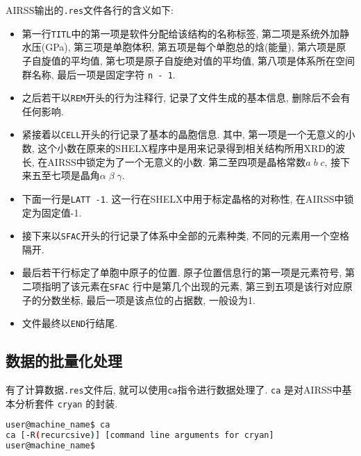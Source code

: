 \documentclass[a4paper, 10pt]{article}
\begin{document}
AIRSS输出的\verb|.res|文件各行的含义如下:
\begin{itemize}
\item 第一行\verb|TITL|中的第一项是软件分配给该结构的名称标签, 第二项是系统外加静水压(GPa), 第三项是单胞体积, 第五项是每个单胞总的焓(能量), 第六项是原子自旋值的平均值, 第七项是原子自旋绝对值的平均值, 第八项是体系所在空间群名称, 最后一项是固定字符 \verb|n - 1|.
\item 之后若干以\verb|REM|开头的行为注释行, 记录了文件生成的基本信息, 删除后不会有任何影响.
\item 紧接着以\verb|CELL|开头的行记录了基本的晶胞信息. 其中, 第一项是一个无意义的小数, 这个小数在原来的SHELX程序中是用来记录得到相关结构所用XRD的波长, 在AIRSS中锁定为了一个无意义的小数. 第二至四项是晶格常数\(a\;b\;c\), 接下来五至七项是晶角\(\alpha\;\beta\;\gamma\).
\item 下面一行是\verb|LATT -1|. 这一行在SHELX中用于标定晶格的对称性, 在AIRSS中锁定为固定值-1.
\item 接下来以\verb|SFAC|开头的行记录了体系中全部的元素种类, 不同的元素用一个空格隔开.
\item 最后若干行标定了单胞中原子的位置. 原子位置信息行的第一项是元素符号, 第二项指明了该元素在\verb|SFAC| 行中是第几个出现的元素, 第三到五项是该行对应原子的分数坐标, 最后一项是该点位的占据数, 一般设为1.
\item 文件最终以\verb|END|行结尾.
\end{itemize}

\subsection{数据的批量化处理}
有了计算数据\verb|.res|文件后, 就可以使用\verb|ca|指令进行数据处理了. \verb|ca| 是对AIRSS中基本分析套件 \verb|cryan| 的封装. 
\begin{lstlisting}[language={bash}]
user@machine_name$ ca
ca [-R(recurcsive)] [command line arguments for cryan]
user@machine_name$
\end{lstlisting}
\end{document}
